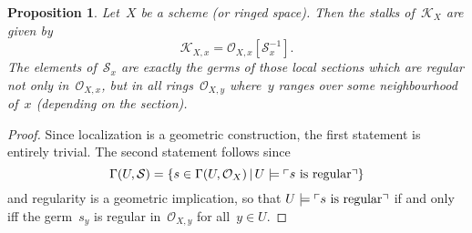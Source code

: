 \documentclass[10pt]{amsart}
\theoremstyle{definition}
\theoremstyle{plain}
\newtheorem{prop}[defn]{Proposition}
\theoremstyle{remark}
\renewcommand{\O}{\mathcal{O}}
\newcommand{\K}{\mathcal{K}}
\renewcommand{\S}{\mathcal{S}}
\newcommand{\?}{\,{:}\,}
\renewcommand{\_}{\mathpunct{.}\,}
\newcommand{\speak}[1]{\ulcorner\text{\textnormal{#1}}\urcorner}
\begin{document}
\begin{prop}Let~$X$ be a scheme (or ringed space). Then the stalks of~$\K_X$
are given by
\[ \K_{X,x} = \O_{X,x}[\S_x^{-1}]. \]
The elements of~$\S_x$ are exactly the germs of those local sections which are
regular not only in~$\O_{X,x}$, but in all rings~$\O_{X,y}$ where~$y$
ranges over some neighbourhood of~$x$ (depending on the section).\end{prop}
\begin{proof}
Since localization is a geometric construction, the first statement is entirely
trivial. The second statement follows since
\[ \Gamma(U,\S) = \{ s\in\Gamma(U,\O_X) \,|\, U \models \speak{$s$ is regular}
\} \]
and regularity is a geometric implication, so that
$U \models \speak{$s$ is regular}$ if and only iff the germ~$s_y$ is regular
in~$\O_{X,y}$ for all~$y \in U$.
\end{proof}
\end{document}

